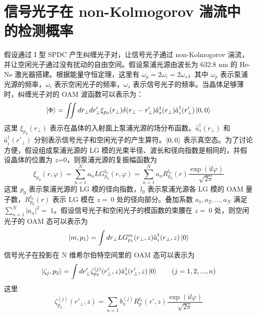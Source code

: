 \documentclass[master]{thesis-uestc}
\begin{document}
\section{信号光子在 non-Kolmogorov 湍流中的检测概率}

假设通过 I 型 SPDC 产生纠缠光子对，让信号光子通过 non-Kolmogorov 湍流，并让空闲光子通过没有扰动的自由空间。假设泵浦光源由波长为 632.8 nm 的 He-Ne 激光器搭建。根据能量守恒定理，这里有 $\omega_p=2\omega_i=2\omega_s$，其中 $\omega_p$ 表示泵浦光源的频率，$\omega_i$ 表示空闲光子的频率，$\omega_s$ 表示信号光子的频率。当晶体足够薄时，纠缠光子对的 OAM 波函数可以表示为\citeup{}：
\begin{equation}
\ket{\Phi}=\iint dr_{\perp}dr'_\perp\xi_{p_0}(r_\perp)\delta(r_\perp-r'_\perp)\hat{a}^\dag_s(r_\perp)\hat{a}^\dag_i(r'_\perp)\ket{0,0}
 \label{entangled_state}
\end{equation}
\noindent 这里 $\xi_{p_0}(r_\perp)$ 表示在晶体的入射面上泵浦光源的场分布函数。$\hat{a}^\dag_s(r_\perp)$ 和 $\hat{a}^\dag_i(r'_\perp)$ 分别表示信号光子和空闲光子的产生算符。$\ket{0,0}$ 表示真空态。为了讨论方便，假设组成泵浦光源的 LG 模的光束半径、波长和径向指数是相同的，并假设晶体的位置为 $z$=0，则泵浦光源的复振幅函数为 \citeup{}
\begin{equation}
\xi_{p_0}(r,\varphi)=\sum_{n=1}^{N}a_{n}LG_{p_0}^{l_0}(r,\varphi)=\sum_{n=1}^{N}a_{n}R_{p_0}^{l_0}(r)\frac{\exp(\mathrm{i}l\varphi)}{\sqrt{2\pi}}
 \label{pump_function}
\end{equation}
\noindent 这里 $p_0$ 表示泵浦光源的 LG 模的径向指数，$l_0$ 表示泵浦光源各 LG 模的 OAM 量子数，$R_{p_0}^{l_0}(r)$ 表示 LG 模在 $z=~0$ 处的径向部分。叠加系数 $a_1,a_2,...,a_N$ 满足 $\sum_{n=1}^{N}|a_{n}|^2=~1$。假设信号光子和空闲光子的模函数的束腰在 $z=~0$ 处，则空闲光子的 OAM 态可以表示为 \citeup{}
\begin{equation}
\ket{m,p_1}=\int dr_{\perp}LG_{p_1}^{m}(r_\perp,z)\hat{a}^\dag_i(r_\perp,z)\ket{0}
 \label{idler_state}
\end{equation}
\noindent 信号光子在投影在 N 维希尔伯特空间里的 OAM 态可以表示为\citeup{}
 \begin{equation}
\ket{\zeta_j,p_2}=\int dr'_{\perp}\zeta_{p_2}^{(j)}(r'_\perp,z)\hat{a}^\dag_s(r'_\perp,z)\ket{0}\qquad(j=1,2,...,n)
 \label{sugnal_state}
\end{equation}
\noindent 这里
 \begin{equation}
\zeta_{p_2}^{(j)}(r'_\perp,z)=\sum_{n=1}b_n^{(j)}R_{p}^{l_n}(r',z)\frac{\exp(\mathrm{i}l\varphi)}{\sqrt{2\pi}}
 \label{sugnal_state1}
\end{equation}
\end{document}
